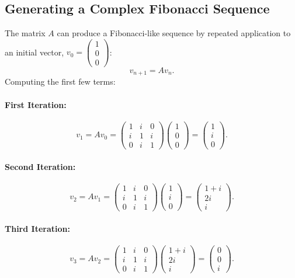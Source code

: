 \subsection*{Generating a Complex Fibonacci Sequence}

The matrix \(A\) can produce a Fibonacci-like sequence by repeated application to an initial vector, \(v_0 = \begin{pmatrix} 1 \\ 0 \\ 0 \end{pmatrix}\):
\[
v_{n+1} = A v_n.
\]
Computing the first few terms:

\paragraph{First Iteration:}
\[
v_1 = A v_0 = 
\begin{pmatrix}
1 & i & 0 \\
i & 1 & i \\
0 & i & 1
\end{pmatrix}
\begin{pmatrix}
1 \\ 0 \\ 0
\end{pmatrix}
=
\begin{pmatrix}
1 \\ i \\ 0
\end{pmatrix}.
\]

\paragraph{Second Iteration:}
\[
v_2 = A v_1 = 
\begin{pmatrix}
1 & i & 0 \\
i & 1 & i \\
0 & i & 1
\end{pmatrix}
\begin{pmatrix}
1 \\ i \\ 0
\end{pmatrix}
=
\begin{pmatrix}
1 + i \\ 2i \\ i
\end{pmatrix}.
\]

\paragraph{Third Iteration:}
\[
v_3 = A v_2 = 
\begin{pmatrix}
1 & i & 0 \\
i & 1 & i \\
0 & i & 1
\end{pmatrix}
\begin{pmatrix}
1 + i \\ 2i \\ i
\end{pmatrix}
=
\begin{pmatrix}
0 \\ 0 \\ i
\end{pmatrix}.
\]

